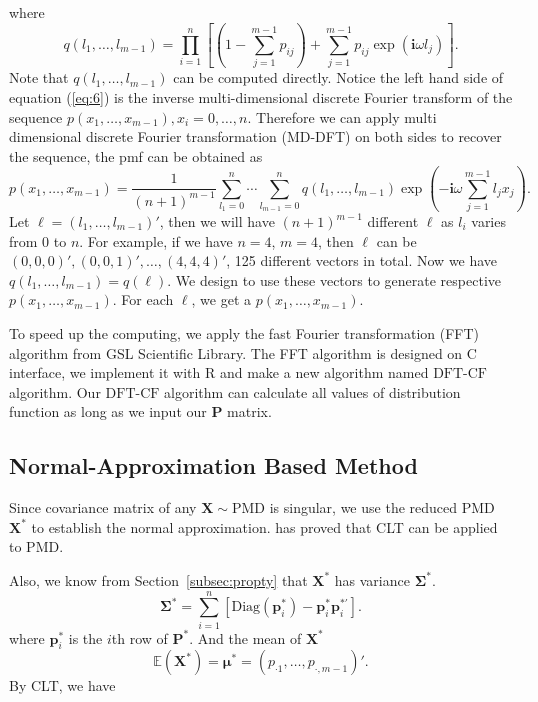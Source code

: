 \documentclass[12pt]{article}
\newcommand{\Sigmavec}{{\boldsymbol{\Sigma}}}
\newcommand{\EE}{\mathbb{E}}
\newcommand{\Pmat}{\mathbf{P}}
\newcommand{\pvec}{\boldsymbol{p}}
\newcommand{\ivec}{{\boldsymbol{i}}}
\newcommand{\diag}{\textrm{Diag}}
\newcommand{\PMD}{\textrm{PMD}}
\newcommand{\Xvec}{\boldsymbol{X}}
\newcommand{\muvec}{\boldsymbol{\mu}}
\newcommand{\Sig}{\boldsymbol{\Sigma}}
\newcommand{\dft}{{\textrm{DFT-CF}}}
\begin{document}
where
$$
q(l_1, \ldots, l_{m-1})=\prod_{i=1}^{n}\left[(1 - \sum_{j=1}^{m-1}p_{ij})+\sum_{j=1}^{m-1}p_{ij}\exp(\ivec \omega l_j)\right].
$$	
Note that $q(l_1, \ldots, l_{m-1})$ can be computed directly. Notice the left hand side of equation (\ref{eq:6}) is the inverse multi-dimensional discrete Fourier transform of the sequence $ p(x_1,\ldots,x_{m-1}), x_i = 0 , \dots, n$. Therefore we can apply multi dimensional discrete Fourier transformation (MD-DFT) on both sides to recover the sequence, the pmf can be obtained as
\begin{equation}\label{eq:7}
p(x_1, \ldots, x_{m-1}) = \frac{1}{(n+1)^{m-1}}\sum_{l_1 = 0}^{n}\cdots \sum_{l_{m-1} = 0}^n q(l_1, \ldots, l_{m-1}) \exp\left(-\ivec\omega\sum_{j=1}^{m-1}l_j x_j\right).
\end{equation}
Let $\ell = (l_1,\dots,l_{m-1})'$, then we will have $(n
+1)^{m-1}$ different $\ell$ as $l_i$ varies from $0$ to $n$. For example, if we have $n=4$, $m=4$, then $\ell$ can be $(0, 0, 0)', (0, 0, 1)', \dots, (4, 4, 4)'$, 125 different vectors in total. Now we have $q(l_1,\dots,l_{m-1}) = q(\ell)$. We design to use these vectors to generate respective $p(x_1,\dots,x_{m-1})$. For each $\ell$, we get a $p(x_1,\dots,x_{m-1})$.

To speed up the computing, we apply the fast Fourier transformation (FFT) algorithm  from GSL Scientific Library. The FFT algorithm is designed on C interface, we implement it with R and make a new algorithm named $\dft$ algorithm. Our $\dft$ algorithm can calculate all values of distribution function as long as we input our $\Pmat$ matrix.



\subsection{Normal-Approximation Based Method}
Since covariance matrix of any $\Xvec \sim \PMD$ is singular, we use the reduced $\PMD$ $\Xvec^{\ast}$ to establish the normal approximation.   has proved that CLT can be applied to $\PMD$. 

Also, we know from Section~\ref{subsec:propty} that $\Xvec^{\ast}$ has variance  $\Sigmavec^{\ast}$. 
$$\Sig^{\ast}=\sum_{i=1}^n[\diag(\pvec_i^{\ast})-\pvec_i^{\ast} \pvec_i^{\ast \prime} ].$$
where $\pvec_i^{\ast}$ is the $i$th row of $\Pmat^{\ast}$. And the mean of $\Xvec^{\ast}$
  $$\EE(\Xvec^{\ast}) =\muvec^{\ast} = \left( p_{\cdot1} ,\dots,p_{\cdot,m-1}\right)'.$$
By CLT, we have 
 
\end{document}
